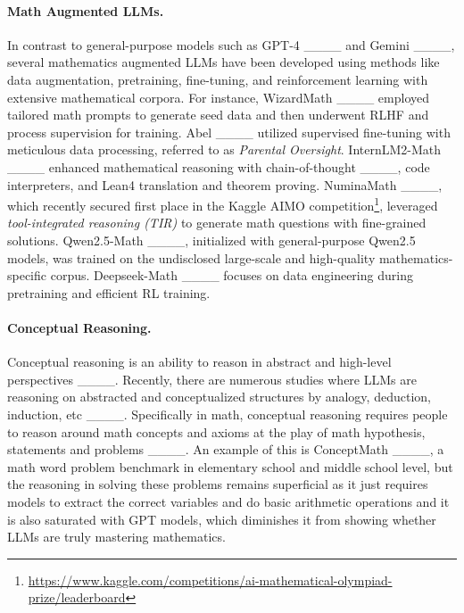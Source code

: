 \paragraph{Math Augmented LLMs.} In contrast to general-purpose models such as GPT-4 ____ and Gemini ____, several mathematics augmented LLMs have been developed using methods like data augmentation, pretraining, fine-tuning, and reinforcement learning with extensive mathematical corpora. For instance, WizardMath ____ employed tailored math prompts to generate seed data and then underwent RLHF and process supervision for training. Abel ____ utilized supervised fine-tuning with meticulous data processing, referred to as \textit{Parental Oversight}. InternLM2-Math ____ enhanced mathematical reasoning with chain-of-thought ____, code interpreters, and Lean4 translation and theorem proving. NuminaMath ____, which recently secured first place in the Kaggle AIMO competition\footnote{\url{https://www.kaggle.com/competitions/ai-mathematical-olympiad-prize/leaderboard}}, leveraged \textit{tool-integrated reasoning (TIR)} to generate math questions with fine-grained solutions. Qwen2.5-Math ____, initialized with general-purpose Qwen2.5 models, was trained on the undisclosed large-scale and high-quality mathematics-specific corpus. Deepseek-Math ____ focuses on data engineering during pretraining and efficient RL training. 

\paragraph{Conceptual Reasoning.} Conceptual reasoning is an ability to reason in abstract and high-level perspectives ____. Recently, there are numerous studies where LLMs are reasoning on abstracted and conceptualized structures by analogy, deduction, induction, etc ____. Specifically in math, conceptual reasoning requires people to reason around math concepts and axioms at the play of math hypothesis, statements and problems ____. An example of this is ConceptMath ____, a math word problem benchmark in elementary school and middle school level, but the reasoning in solving these problems remains superficial as it just requires models to extract the correct variables and do basic arithmetic operations and it is also saturated with GPT models, which diminishes it from showing whether LLMs are truly mastering mathematics.